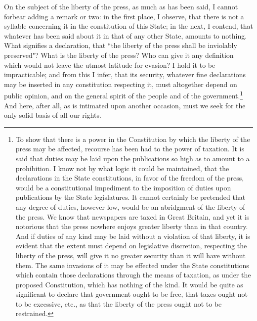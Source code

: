 On the subject of the liberty of the press, as much as has been said, I cannot forbear adding a remark or two: in the first place, I observe, that there is not a syllable concerning it in the constitution of this State; in the next, I contend, that whatever has been said about it in that of any other State, amounts to nothing. 
What signifies a declaration, that ``the liberty of the press shall be inviolably preserved"? 
What is the liberty of the press? 
Who can give it any definition which would not leave the utmost latitude for evasion? 
I hold it to be impracticable; and from this I infer, that its security, whatever fine declarations may be inserted in any constitution respecting it, must altogether depend on public opinion, and on the general spirit of the people and of the government.\footnote{To show that there is a power in the Constitution by which the liberty of the press may be affected, recourse has been had to the power of taxation. 
It is said that duties may be laid upon the publications so high as to amount to a prohibition. 
I know not by what logic it could be maintained, that the declarations in the State constitutions, in favor of the freedom of the press, would be a constitutional impediment to the imposition of duties upon publications by the State legislatures. 
It cannot certainly be pretended that any degree of duties, however low, would be an abridgment of the liberty of the press. 
We know that newspapers are taxed in Great Britain, and yet it is notorious that the press nowhere enjoys greater liberty than in that country. 
And if duties of any kind may be laid without a violation of that liberty, it is evident that the extent must depend on legislative discretion, respecting the liberty of the press, will give it no greater security than it will have without them. 
The same invasions of it may be effected under the State constitutions which contain those declarations through the means of taxation, as under the proposed Constitution, which has nothing of the kind. 
It would be quite as significant to declare that government ought to be free, that taxes ought not to be excessive, etc., as that the liberty of the press ought not to be restrained.} And here, after all, as is intimated upon another occasion, must we seek for the only solid basis of all our rights.

